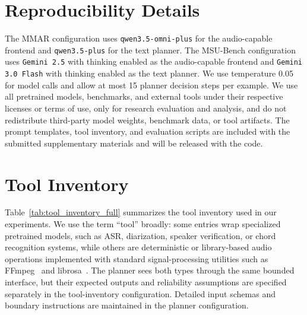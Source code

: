 \documentclass[11pt]{article}
\begin{document}
\section{Reproducibility Details}
\label{sec:reproducibility_appendix}

The MMAR configuration uses \texttt{qwen3.5-omni-plus} for the audio-capable frontend and \texttt{qwen3.5-plus} for the text planner. The MSU-Bench configuration uses \texttt{Gemini 2.5} with thinking enabled as the audio-capable frontend and \texttt{Gemini 3.0 Flash} with thinking enabled as the text planner. We use temperature 0.05 for model calls and allow at most 15 planner decision steps per example. We use all pretrained models, benchmarks, and external tools under their respective licenses or terms of use, only for research evaluation and analysis, and do not redistribute third-party model weights, benchmark data, or tool artifacts. The prompt templates, tool inventory, and evaluation scripts are included with the submitted supplementary materials and will be released with the code.

\section{Tool Inventory}
\label{sec:tool_inventory_appendix}

Table~\ref{tab:tool_inventory_full} summarizes the tool inventory used in our experiments. We use the term ``tool'' broadly: some entries wrap specialized pretrained models, such as ASR, diarization, speaker verification, or chord recognition systems, while others are deterministic or library-based audio operations implemented with standard signal-processing utilities such as FFmpeg~\citep{tomar2006converting} and librosa~\citep{mcfee2015librosa}. The planner sees both types through the same bounded interface, but their expected outputs and reliability assumptions are specified separately in the tool-inventory configuration. Detailed input schemas and boundary instructions are maintained in the planner configuration.
\end{document}
